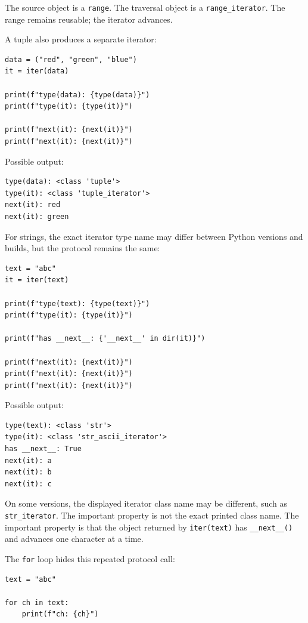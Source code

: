 The source object is a \texttt{range}. The traversal object is a \texttt{range\_iterator}. The range remains reusable; the iterator advances.

A tuple also produces a separate iterator:

\begin{verbatim}
data = ("red", "green", "blue")
it = iter(data)

print(f"type(data): {type(data)}")
print(f"type(it): {type(it)}")

print(f"next(it): {next(it)}")
print(f"next(it): {next(it)}")
\end{verbatim}

Possible output:

\begin{verbatim}
type(data): <class 'tuple'>
type(it): <class 'tuple_iterator'>
next(it): red
next(it): green
\end{verbatim}

For strings, the exact iterator type name may differ between Python versions and builds, but the protocol remains the same:

\begin{verbatim}
text = "abc"
it = iter(text)

print(f"type(text): {type(text)}")
print(f"type(it): {type(it)}")

print(f"has __next__: {'__next__' in dir(it)}")

print(f"next(it): {next(it)}")
print(f"next(it): {next(it)}")
print(f"next(it): {next(it)}")
\end{verbatim}

Possible output:

\begin{verbatim}
type(text): <class 'str'>
type(it): <class 'str_ascii_iterator'>
has __next__: True
next(it): a
next(it): b
next(it): c
\end{verbatim}

On some versions, the displayed iterator class name may be different, such as \texttt{str\_iterator}. The important property is not the exact printed class name. The important property is that the object returned by \texttt{iter(text)} has \texttt{\_\_next\_\_()} and advances one character at a time.

The \texttt{for} loop hides this repeated protocol call:

\begin{verbatim}
text = "abc"

for ch in text:
    print(f"ch: {ch}")
\end{verbatim}

